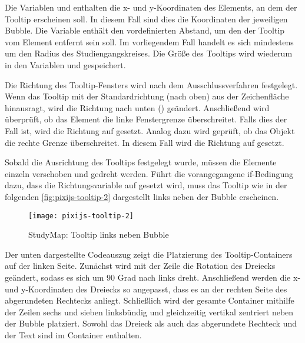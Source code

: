 Die Variablen  und  enthalten die x- und y-Koordinaten des Elements, an dem der Tooltip erscheinen soll. In diesem Fall sind dies die Koordinaten der jeweiligen Bubble. Die Variable  enthält den vordefinierten Abstand, um den der Tooltip vom Element entfernt sein soll. Im vorliegendem Fall handelt es sich mindestens um den Radius des Studiengangskreises. Die Größe des Tooltips wird wiederum in den Variablen  und  gespeichert.

Die Richtung des Tooltip-Fensters wird nach dem Ausschlussverfahren festgelegt. Wenn das Tooltip mit der Standardrichtung  (nach oben) aus der Zeichenfläche hinausragt, wird die Richtung nach unten () geändert. Anschließend wird überprüft, ob das Element die linke Fenstergrenze überschreitet. Falls dies der Fall ist, wird die Richtung auf  gesetzt. Analog dazu wird geprüft, ob das Objekt die rechte Grenze überschreitet. In diesem Fall wird die Richtung auf  gesetzt.

Sobald die Ausrichtung des Tooltips festgelegt wurde, müssen die Elemente einzeln verschoben und gedreht werden. Führt die vorangegangene if-Bedingung dazu, dass die Richtungsvariable  auf  gesetzt wird, muss das Tooltip wie in der folgenden \autoref{fig:pixijs-tooltip-2} dargestellt links neben der Bubble erscheinen.

\begin{figure}[H]
    \centering
    \texttt{[image: pixijs-tooltip-2]}
    \caption{StudyMap: Tooltip links neben Bubble}
    \label{fig:pixijs-tooltip-2}
\end{figure}

Der unten dargestellte Codeauszug zeigt die Platzierung des Tooltip-Containers auf der linken Seite. Zunächst wird mit der Zeile  die Rotation des Dreiecks geändert, sodass es sich um 90 Grad nach links dreht. Anschließend werden die x- und y-Koordinaten des Dreiecks so angepasst, dass es an der rechten Seite des abgerundeten Rechtecks anliegt. Schließlich wird der gesamte Container mithilfe der Zeilen sechs und sieben linksbündig und gleichzeitig vertikal zentriert neben der Bubble platziert. Sowohl das Dreieck als auch das abgerundete Rechteck und der Text sind im Container enthalten. %

